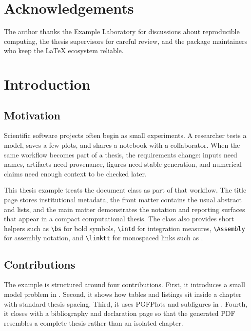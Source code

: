 \chapter*{Acknowledgements}
The author thanks the Example Laboratory for discussions about reproducible
computing, the thesis supervisors for careful review, and the package
maintainers who keep the LaTeX ecosystem reliable.

\tableofcontents
\listoffigures
\listoftables

\mainmatter
\chapter{Introduction}
\label{ch:introduction}

\section{Motivation}
\label{sec:motivation}

Scientific software projects often begin as small experiments. A researcher
tests a model, saves a few plots, and shares a notebook with a collaborator.
When the same workflow becomes part of a thesis, the requirements change:
inputs need names, artifacts need provenance, figures need stable generation,
and numerical claims need enough context to be checked later.

This thesis example treats the document class as part of that workflow. The
title page stores institutional metadata, the front matter contains the usual
abstract and lists, and the main matter demonstrates the notation and reporting
surfaces that appear in a compact computational thesis. The class also provides
short helpers such as \verb|\bs| for bold symbols, \verb|\intd| for integration
measures, \verb|\Assembly| for assembly notation, and \verb|\linktt| for
monospaced links such as .

\section{Contributions}
\label{sec:contributions}

The example is structured around four contributions. First, it introduces a
small model problem in . Second, it shows how tables and
listings sit inside a chapter with standard thesis spacing. Third, it uses
PGFPlots and subfigures in . Fourth, it closes with a
bibliography and declaration page so that the generated PDF resembles a complete
thesis rather than an isolated chapter.

